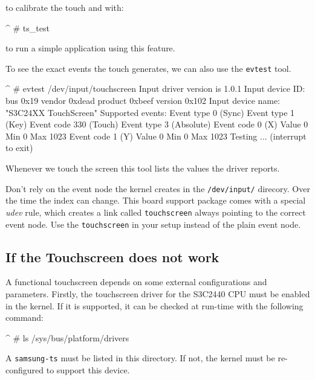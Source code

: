 to calibrate the touch and with:

\begin{ptxshell}[escapechar=|]{^}
# ts_test
\end{ptxshell}

to run a simple application using this feature.

To see the exact events the touch generates, we can also use the
\texttt{evtest} tool.

\begin{ptxshell}[escapechar=|]{^}
# evtest /dev/input/touchscreen
Input driver version is 1.0.1
Input device ID: bus 0x19 vendor 0xdead product 0xbeef version 0x102
Input device name: "S3C24XX TouchScreen"
Supported events:
  Event type 0 (Sync)
  Event type 1 (Key)
    Event code 330 (Touch)
  Event type 3 (Absolute)
    Event code 0 (X)
     Value      0
     Min        0
     Max     1023
  Event code 1 (Y)
     Value      0
     Min        0
     Max     1023
Testing ... (interrupt to exit)
\end{ptxshell}

Whenever we touch the screen this tool lists the values the driver reports.

\begin{important}
Don't rely on the event node the kernel creates in the \texttt{/dev/input/}
direcory. Over the time the index can change. This board support package comes
with a special \textit{udev} rule, which creates a link called \texttt{touchscreen}
always pointing to the correct event node. Use the \texttt{touchscreen} in your
setup instead of the plain event node.
\end{important}

\subsection{If the Touchscreen does not work}

A functional touchscreen depends on some external configurations and parameters.
Firstly, the touchscreen driver for the S3C2440 CPU must be enabled in the
kernel. If it is supported, it can be checked at run-time with the following
command:

\begin{ptxshell}[escapechar=|]{^}
# ls /sys/bus/platform/drivers
\end{ptxshell}

A \texttt{samsung-ts} must be listed in this directory. If not, the kernel
must be re-configured to support this device.

